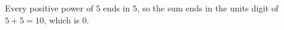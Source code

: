 Every positive power of $5$ ends in $5$, so the sum ends in the units digit of $5+5=10$, which is $\boxed{0}$.

